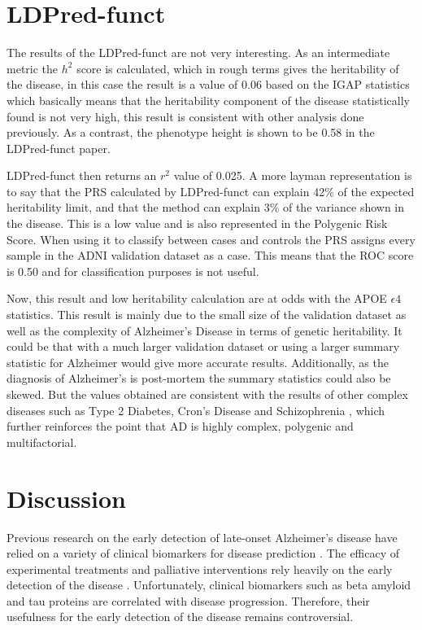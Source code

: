 \clearpage
\section{LDPred-funct}

The results of the LDPred-funct are not very interesting. As an intermediate metric the $h^2$ score is calculated, which in rough terms  gives the heritability of the disease, in this case the result is a value of 0.06 based on the IGAP statistics which basically means that the heritability component of the disease statistically found is not very high, this result is consistent with other analysis done previously. As a contrast, the phenotype height is shown to be 0.58 in the LDPred-funct paper.

LDPred-funct then returns an $r^2$ value of 0.025. A more layman representation is to say that the PRS calculated by LDPred-funct can explain 42\% of the expected heritability limit, and that the method can explain 3\% of the variance shown in the disease. This is a low value and is also represented in the Polygenic Risk Score. When using it to classify between cases and controls the PRS assigns every sample in the ADNI validation dataset as a case. This means that the ROC score is 0.50 and for classification purposes is not useful.

Now, this result and low heritability calculation are at odds with the APOE $\epsilon4$ statistics. This result is mainly due to the small size of the validation dataset as well as the complexity of Alzheimer's Disease in terms of genetic heritability. It could be that with a much larger validation dataset or using a larger summary statistic for Alzheimer would give more accurate results. Additionally, as the diagnosis of Alzheimer's is post-mortem the summary statistics could also be skewed. But the values obtained are consistent with the results of other complex diseases such as Type 2 Diabetes, Cron's Disease and Schizophrenia \cite{Consortium2009}, which further reinforces the point that AD is highly complex, polygenic and multifactorial.

\section{Discussion}


Previous research on the early detection of late-onset Alzheimer's disease have relied on a variety of clinical biomarkers for disease prediction \cite{Alexiou2017}. The efficacy of experimental treatments and palliative interventions rely heavily on the early detection of the disease \cite{Dufouil2018}. Unfortunately, clinical biomarkers such as beta amyloid and tau proteins are correlated with disease progression. Therefore, their usefulness for the early detection of the disease remains controversial.

